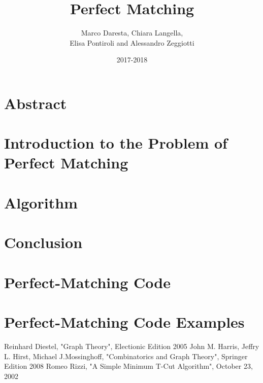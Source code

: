 \documentclass[12pt,a4paper]{report}
\theoremstyle{plain}
\theoremstyle{definition}
\theoremstyle{remark}
\begin{document}
\title{\textbf{Perfect Matching}} %
\author{Marco Daresta, Chiara Langella, \\ Elisa Pontiroli and Alessandro Zeggiotti }
\date{2017-2018}
\maketitle
\chapter*{Abstract}

\tableofcontents
\chapter{Introduction to the Problem of Perfect Matching}

\chapter{Algorithm}


\chapter{Conclusion}


\appendix
\chapter{Perfect-Matching Code}

\chapter{Perfect-Matching Code Examples}


\begin{thebibliography}{90}        
 Reinhard Diestel, "Graph Theory", Electionic Edition 2005
 John M. Harris, Jeffry L. Hirst, Michael J.Mossinghoff, "Combinatorics and Graph Theory", Springer Edition 2008
 Romeo Rizzi, "A Simple Minimum T-Cut Algorithm", October 23, 2002
\end{thebibliography}
\end{document}
